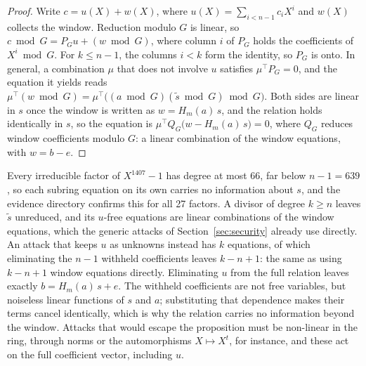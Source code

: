 \documentclass[11pt,a4paper]{article}
\theoremstyle{definition}
\begin{document}
\begin{proof}
Write $c = u(X) + w(X)$, where $u(X) = \sum_{i < n-1} c_i X^i$ and $w(X)$ collects the window. Reduction modulo $G$ is linear, so $c \bmod G = P_G u + (w \bmod G)$, where column $i$ of $P_G$ holds the coefficients of $X^i \bmod G$. For $k \le n - 1$, the columns $i < k$ form the identity, so $P_G$ is onto. In general, a combination $\mu$ that does not involve $u$ satisfies $\mu^{\top} P_G = 0$, and the equation it yields reads $\mu^{\top}(w \bmod G) = \mu^{\top}\bigl((a \bmod G)(\tilde{s} \bmod G) \bmod G\bigr)$. Both sides are linear in $s$ once the window is written as $w = H_m(a)\,s$, and the relation holds identically in $s$, so the equation is $\mu^{\top} Q_G \bigl(w - H_m(a)\,s\bigr) = 0$, where $Q_G$ reduces window coefficients modulo $G$: a linear combination of the window equations, with $w = b - e$.
\end{proof}

Every irreducible factor of $X^{1407} - 1$ has degree at most $66$, far below $n - 1 = 639$, so each subring equation on its own carries no information about $s$, and the evidence directory confirms this for all 27 factors. A divisor of degree $k \ge n$ leaves $\tilde{s}$ unreduced, and its $u$-free equations are linear combinations of the window equations, which the generic attacks of Section~\ref{sec:security} already use directly. An attack that keeps $u$ as unknowns instead has $k$ equations, of which eliminating the $n - 1$ withheld coefficients leaves $k - n + 1$: the same as using $k - n + 1$ window equations directly. Eliminating $u$ from the full relation leaves exactly $b = H_m(a)\,s + e$. The withheld coefficients are not free variables, but noiseless linear functions of $s$ and $a$; substituting that dependence makes their terms cancel identically, which is why the relation carries no information beyond the window. Attacks that would escape the proposition must be non-linear in the ring, through norms or the automorphisms $X \mapsto X^t$, for instance, and these act on the full coefficient vector, including $u$.
\end{document}
